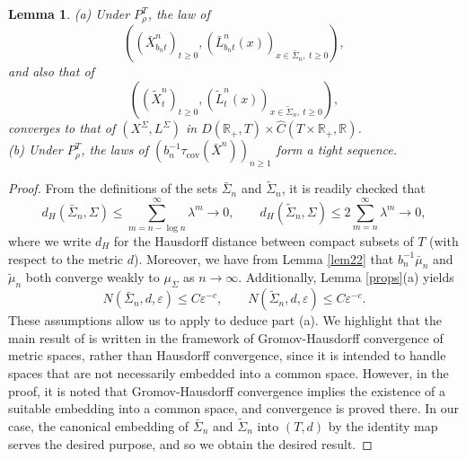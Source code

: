 \documentclass[a4paper, 11pt]{article}
\newtheorem{lem}[theorem]{Lemma}
\begin{document}
\begin{lem}\label{lem41} (a) Under $P^T_\rho$, the law of
\[\left(\left(\bar{X}^n_{b_nt}\right)_{t\geq 0},\left(\bar{L}^n_{b_nt}(x)\right)_{x\in \bar{\Sigma}_n,\:t\geq 0}\right),\]
and also that of
\[\left(\left(\tilde{X}^n_t\right)_{t\geq 0},\left(\tilde{L}^n_{t}(x)\right)_{x\in \tilde{\Sigma}_n,\:t\geq 0}\right),\]
converges to that of $(X^\Sigma,L^\Sigma)$ in $D(\mathbb{R}_+,T)\times \hat{C}(T\times \mathbb{R}_+,\mathbb{R})$.\\
(b) Under $P^T_\rho$, the laws of $(b_n^{-1}\tau_{\mathrm{cov}}(\bar{X}^n))_{n\geq 1}$ form a tight sequence.
\end{lem}
\begin{proof}
From the definitions of the sets $\bar\Sigma_n$ and $\tilde{\Sigma}_n$, it is readily checked that
\[d_H\left(\bar\Sigma_n,\Sigma\right)\leq \sum_{m=n-\log n}^\infty\lambda^m\rightarrow0,\qquad d_H\left(\tilde\Sigma_n,\Sigma\right)\leq 2\sum_{m=n}^\infty\lambda^m\rightarrow0,\]
where we write $d_H$ for the Hausdorff distance between compact subsets of $T$ (with respect to the metric $d$). Moreover, we have from Lemma \ref{lem22} that $b_n^{-1}\bar\mu_n$ and $\tilde\mu_n$ both converge weakly to $\mu_\Sigma$ as $n\rightarrow\infty$. Additionally, Lemma \ref{props}(a) yields
\[N\left(\bar\Sigma_n,d,\varepsilon\right)\leq C\varepsilon^{-c},\qquad N\left(\tilde\Sigma_n,d,\varepsilon\right)\leq C\varepsilon^{-c}.\]
These assumptions allow us to apply \cite[Theorem 1.8]{Noda} to deduce part (a). We highlight that the main result of \cite{Noda} is written in the framework of Gromov-Hausdorff convergence of metric spaces, rather than Hausdorff convergence, since it is intended to handle spaces that are not necessarily embedded into a common space. However, in the proof, it is noted that Gromov-Hausdorff convergence implies the existence of a suitable embedding into a common space, and convergence is proved there. In our case, the canonical embedding of $\bar\Sigma_n$ and $\tilde{\Sigma}_n$ into $(T,d)$ by the identity map serves the desired purpose, and so we obtain the desired result.


\end{proof}
\end{document}
